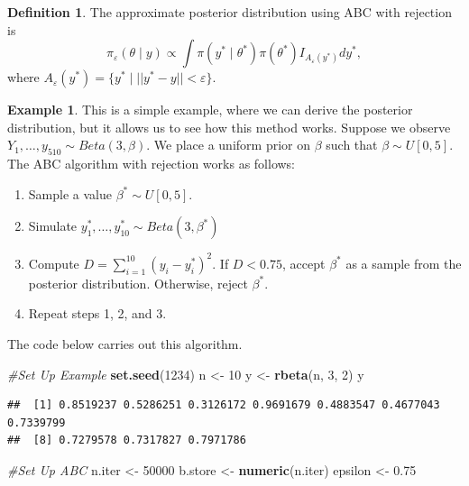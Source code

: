 \documentclass[
]{book}
\newenvironment{Shaded}{\begin{snugshade}}{\end{snugshade}}
\newcommand{\CommentTok}[1]{\textcolor[rgb]{0.56,0.35,0.01}{\textit{#1}}}
\newcommand{\DecValTok}[1]{\textcolor[rgb]{0.00,0.00,0.81}{#1}}
\newcommand{\FloatTok}[1]{\textcolor[rgb]{0.00,0.00,0.81}{#1}}
\newcommand{\FunctionTok}[1]{\textcolor[rgb]{0.13,0.29,0.53}{\textbf{#1}}}
\newcommand{\NormalTok}[1]{#1}
\newcommand{\OtherTok}[1]{\textcolor[rgb]{0.56,0.35,0.01}{#1}}
\providecommand{\tightlist}{%
  \setlength{\itemsep}{0pt}\setlength{\parskip}{0pt}}
\theoremstyle{definition}
\newtheorem{definition}{Definition}[chapter]
\theoremstyle{definition}
\newtheorem{example}{Example}[chapter]
\theoremstyle{definition}
\theoremstyle{definition}
\theoremstyle{remark}
\begin{document}
\begin{definition}
The approximate posterior distribution using ABC with rejection is
\[
\pi_\varepsilon(\theta \mid y) \propto \int \pi(y^* \mid \theta^*)\pi(\theta^*)I_{A_\varepsilon(y^*)} dy^*,
\]
where \({A_\varepsilon(y^*)} = \{y^* \mid ||y^* - y||< \varepsilon\}\).
\end{definition}

\begin{example}

This is a simple example, where we can derive the posterior distribution, but it allows us to see how this method works. Suppose we observe \(Y_1, \ldots, y_510\sim Beta(3, \beta)\). We place a uniform prior on \(\beta\) such that \(\beta \sim U[0, 5]\). The ABC algorithm with rejection works as follows:

\begin{enumerate}
\def\labelenumi{\arabic{enumi}.}
\tightlist
\item
  Sample a value \(\beta^* \sim U[0, 5]\).
\item
  Simulate \(y^*_1, \ldots, y^*_10 \sim Beta(3,\beta^*)\)
\item
  Compute \(D = \sum_{i=1}^{10}(y_i -y^*_i)^2\). If \(D < 0.75\), accept \(\beta^*\) as a sample from the posterior distribution. Otherwise, reject \(\beta^*\).
\item
  Repeat steps 1, 2, and 3.
\end{enumerate}

The code below carries out this algorithm.

\begin{Shaded}
\begin{Highlighting}[]
\CommentTok{\#Set Up Example}
\FunctionTok{set.seed}\NormalTok{(}\DecValTok{1234}\NormalTok{)}
\NormalTok{n }\OtherTok{\textless{}{-}} \DecValTok{10}
\NormalTok{y }\OtherTok{\textless{}{-}} \FunctionTok{rbeta}\NormalTok{(n, }\DecValTok{3}\NormalTok{, }\DecValTok{2}\NormalTok{)}
\NormalTok{y}
\end{Highlighting}
\end{Shaded}

\begin{verbatim}
##  [1] 0.8519237 0.5286251 0.3126172 0.9691679 0.4883547 0.4677043 0.7339799
##  [8] 0.7279578 0.7317827 0.7971786
\end{verbatim}

\begin{Shaded}
\begin{Highlighting}[]
\CommentTok{\#Set Up ABC}
\NormalTok{n.iter }\OtherTok{\textless{}{-}} \DecValTok{50000}
\NormalTok{b.store }\OtherTok{\textless{}{-}} \FunctionTok{numeric}\NormalTok{(n.iter)}
\NormalTok{epsilon }\OtherTok{\textless{}{-}} \FloatTok{0.75}


\end{Highlighting}
\end{Shaded}
\end{example}
\end{document}

